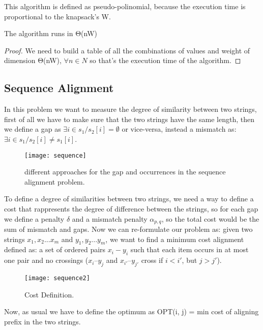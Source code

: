 This algorithm is defined as pseudo-polinomial, because the execution time is proportional to the knapsack's W.\\

\begin{claim}
    The algorithm runs in Θ(nW)
\end{claim}

\begin{proof}
    We need to build a table of all the combinations of values and weight of dimension Θ(nW), $\forall n \in N$ so that's the execution time of the algorithm.
\end{proof}

\subsection{Sequence Alignment}
In this problem we want to measure the degree of similarity between two strings, first of all we have to make sure that the two strings have the same length, then we define a gap as $ \exists i \in s_{1} / s_2[i] = \emptyset$ or vice-versa, instead a mismatch as: $\exists i \in s_{1} / s_2[i] \neq s_{1}[i]$.

\begin{figure}[H]
    \centering
    \texttt{[image: sequence]}
    \caption{different approaches for the gap and occurrences in the sequence alignment problem.}
\end{figure}

To define a degree of similarities between two strings, we need a way to define a cost that rappresents the degree of difference between the strings, so for each gap we define a penalty $\delta$ and a mismatch penalty $\alpha_{p,q}$, so the total cost would be the sum of mismatch and gaps. Now we can re-formulate our problem as: given two strings $x_{1},x_{2}...x_{m}$ and $y_{1},y_{2}...y_{m}$, we want to find a minimum cost alignment defined as: a set of ordered pairs $x_{i} - y_{i}$ such that each item occurs in at most one pair and no crossings ($x_{i} – y_{j}$ and $x_{i'} – y_{j'}$ cross if $i < i '$, but $j > j '$).

\begin{figure}[H]
    \centering
    \texttt{[image: sequence2]}
    \caption{Cost Definition.}
\end{figure}

Now, as usual we have to define the optimum as OPT(i, j) = min cost of aligning prefix in the two strings.


